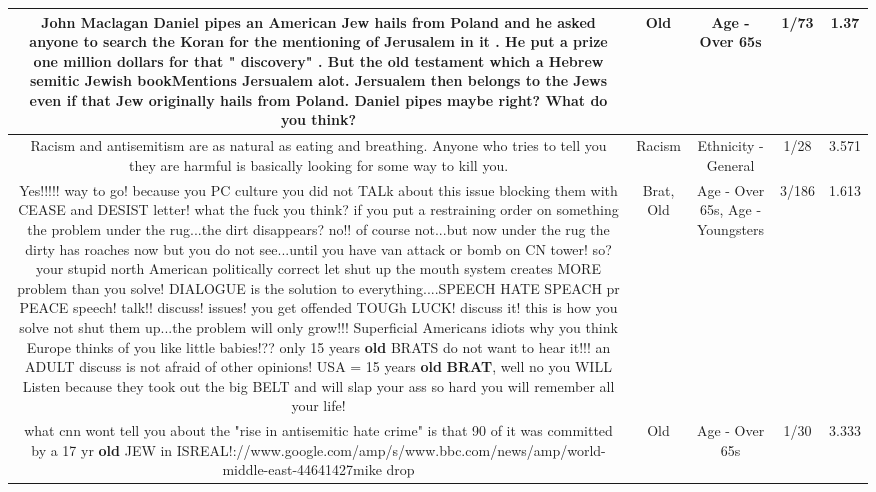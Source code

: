 \documentclass[11pt]{article}
\newlength\mylength
\begin{document}
\begin{center}
\begin{longtable}{|C{.65\mylength}|C{.30\mylength}|C{.12\mylength}|C{.12\mylength}|C{.12\mylength}|}
  \small John Maclagan Daniel pipes an American Jew hails from Poland and he asked anyone to search the Koran for the mentioning of Jerusalem in it . He put a prize one million dollars for that " discovery" . But the \textbf{old} testament which a Hebrew semitic Jewish bookMentions Jersualem alot. Jersualem then belongs to the Jews even if that Jew originally hails from Poland. Daniel pipes maybe right? What do you think?\normalsize   & Old & Age - Over 65s & 1/73 & 1.37 \\  \hline
  \small Racism and antisemitism are as natural as eating and breathing.  Anyone who tries to tell you they are harmful is basically looking for some way to kill you.\normalsize   & Racism & Ethnicity - General & 1/28 & 3.571 \\  \hline
  \small Yes!!!!! way to go! because you PC culture you did not TALk about this issue blocking them with CEASE and DESIST letter! what the fuck you think? if you put a restraining order on something the problem under the rug...the dirt disappears? no!! of course not...but now under the rug the dirty has roaches now but you do not see...until you have van attack or bomb on CN tower! so? your stupid north American politically correct let shut up the mouth system creates MORE problem than you solve! DIALOGUE is the solution to everything....SPEECH HATE SPEACH pr PEACE speech! talk!! discuss! issues! you get offended TOUGh LUCK! discuss it! this is how you solve not shut them up...the problem will only grow!!! Superficial Americans idiots why you think Europe thinks of you like little babies!?? only 15 years \textbf{old} BRATS do not want to hear it!!! an ADULT discuss is not afraid of other opinions! USA = 15 years \textbf{old} \textbf{BRAT},  well no you WILL Listen because they took out the big BELT and will slap your ass so hard you will remember all your life!\normalsize   & Brat, Old & Age - Over 65s, Age - Youngsters & 3/186 & 1.613 \\  \hline
  \small what cnn wont tell you about the "rise in antisemitic hate crime" is that 90 of it was committed by a 17 yr \textbf{old} JEW in ISREAL!://www.google.com/amp/s/www.bbc.com/news/amp/world-middle-east-44641427mike drop\normalsize   & Old & Age - Over 65s & 1/30 & 3.333 \\  \hline

\end{longtable}
\end{center}
\end{document}
